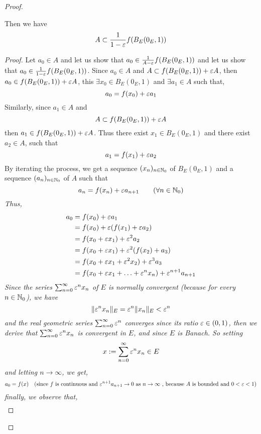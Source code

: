 \begin{proof}
\begin{theorem}[]
Then we have 
\[
	A \subset  \frac{1}{1 - \varepsilon } f(B_{E}(0_{E},1) ) 
\]
\end{theorem}
\begin{proof}
Let $a_0 \in  A $  and let us show that  
$a_0 \in  \frac{1}{A-\varepsilon } f (B_{E}(0_{E},1) )  $  
and let us show that $a_0 \in  \frac{1}{1-\varepsilon }f(B_{E}(0_{E},1) )  $.
Since $a_0 \in  A $  and $A \subset f(B_{E}(0_{E},1) ) + \varepsilon  A  $, then
$a_0 \in  f(B_{E}(0_{E},1) ) + \varepsilon  A $, this $\exists x_0
\in B_{E}(0_{E}, 1) $  and $\exists a_1 \in  A $  such that,
\[
a_0 = f(x_0)  + \varepsilon  a_1
\]
Similarly, since $a_1 \in  A $  and 
\[
A \subset f(B_{E}(0_{E},1) )  + \varepsilon  A
\]
then $a_1 \in  f(B_{E}(0_{E},1 ) ) + \varepsilon  A $. Thus there exist 
$x_1 \in  B_{E}(0_{E},1)  $  and 
there exist $a_2 \in  A $, such that 
\[
a_1 = f(x_1)  + \varepsilon  a_2
\]
By iterating the process, we get a sequence 
$(x_{n}) _{n \in \mathbb{N}_0} $ of $B_{E}(0_{E},1)  $  and a sequence
$(a_{n})_{n \in \mathbb{N}_0}  $  of $A $  such that 
\[
a_{n}= f(x_{n})  + \varepsilon  a_{n+1} \quad \quad 
(\forall n \in \mathbb{N}_0) 
\]
\it Thus,  \normalfont
\begin{align*}
	a_0 &= f(x_0)  + \varepsilon  a_1 \\
	    &= f(x_0)  + \varepsilon  (f(x_1)  + \varepsilon a_2)  \\
	    &= f(x_0 + \varepsilon x_1)  + 
	    \varepsilon ^2 a_2 \\
	    &= f(x_0 + \varepsilon  x_1)  + 
	    \varepsilon ^2 (f(x_2) + a_3)   \\
	    &= f(x_0 + \varepsilon  x_1 + \varepsilon  ^2  x_2)  + \varepsilon ^3 a_3 \\
	    &= f(x_0 + \varepsilon  x_1 + \hdots + \varepsilon ^{n} x_{n})  + 
	    \varepsilon ^{n+1} a_{n+1} \\
\end{align*}
Since the series $\sum_{n=0}^{\infty}  \varepsilon ^{n} x_{n} $  of 
$E $ is normally convergent (because for every $n \in  \mathbb{N}_0 $), 
we have 
\[
\| \varepsilon ^{n} x_{n} \| _{E} = 
\varepsilon ^n \| x_{n} \|  _{E} <  \varepsilon ^n 
\]
and the real geometric series 
$\sum_{n=0}^{\infty}  \varepsilon ^n  $  converges since its ratio
$\varepsilon  \in  (0,1)  $, then we derive that 
$\sum_{n=0}^{\infty}  \varepsilon ^n x_{n} $   is convergent 
in $E $, and since $E $ is Banach. So setting 
\[
x:= \sum_{n=0}^{\infty}  \varepsilon ^n x_{n} \in  E
\]
and letting $n \rightarrow \infty$, we get,
\[
a_0 = f(x) \quad  \text{(since $f $ is continuous and 
$\varepsilon ^{n+1} a_{n+1} \rightarrow 0$ as $n \rightarrow \infty  $
, because $A$ is bounded and 
$0 < \varepsilon  <  1 $)} 
\]
finally, we observe that, 
\begin{align*}

\end{align*}
\end{proof}
\end{proof}
